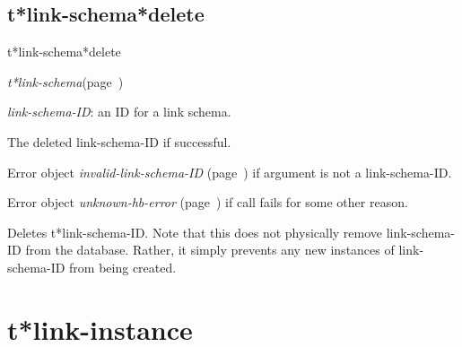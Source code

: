 \subsection{t*link-schema*delete}
\label{t*link-schema*delete}

\begin{description}
\item [Name:]  t*link-schema*delete

\item [Class:] {\sl t*link-schema}\hfill(page~\pageref{t*link-schema})

\item [Parameters:]
\item {\sl link-schema-ID}:  an ID for a link schema.


\item [Return-value:]
The deleted link-schema-ID if successful.

Error object {\sl invalid-link-schema-ID} (page~\pageref{invalid-link-schema-ID}) if argument
is not a link-schema-ID.

Error object {\sl unknown-hb-error} (page~\pageref{unknown-hb-error}) if call fails
for some other reason.

\item [Description:]

Deletes t*link-schema-ID.  Note that this does not
physically remove link-schema-ID from the database.
Rather, it simply prevents any new instances of 
link-schema-ID from being created.

\item [Public:]



\end{description}
\horizontalline

\section{t*link-instance}
\label{t*link-instance}

